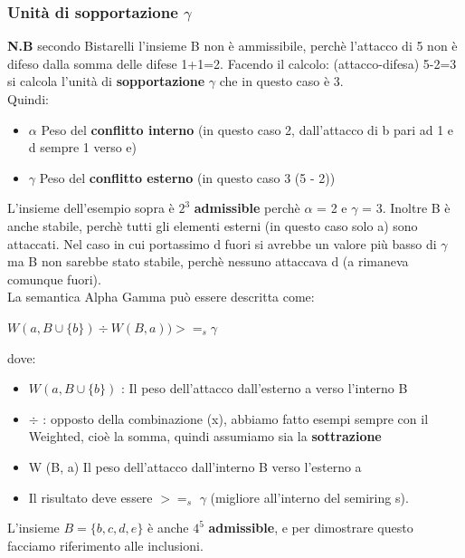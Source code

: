 \subsubsection{Unità di sopportazione $\gamma$}
\textbf{N.B} secondo Bistarelli l’insieme B non è ammissibile, perchè l’attacco di 5 non è difeso dalla somma delle difese 1+1=2. Facendo il calcolo: (attacco-difesa) 5-2=3 si calcola l’unità di \textbf{sopportazione} $\gamma$ che in questo caso è 3.
\\Quindi:
\begin{itemize}
    \item $\alpha$ Peso del \textbf{conflitto interno} (in questo caso 2, dall’attacco di b pari ad 1 e d sempre 1 verso e)
    \item $\gamma$ Peso del \textbf{conflitto esterno} (in questo caso 3 (5 - 2))
\end{itemize}
L’insieme dell’esempio sopra è $2^3$ \textbf{admissible} perchè $\alpha$ = 2 e $\gamma$ = 3. Inoltre B è anche stabile, perchè tutti gli elementi esterni (in questo caso solo a) sono attaccati. Nel caso in cui portassimo d fuori si avrebbe un valore più basso di $\gamma$ ma B non sarebbe stato stabile, perchè nessuno attaccava d (a rimaneva comunque fuori).
\\
La semantica Alpha Gamma può essere descritta come:
\begin{center}
    $W (a, B \cup \{b\}) \div W (B, a)) >=_s \gamma$
\end{center}
dove:
\begin{itemize}
    \item $W (a, B \cup \{b\})$ : Il peso dell’attacco dall’esterno a verso l’interno B
    \item $\div$ : opposto della combinazione (x), abbiamo fatto esempi sempre con il Weighted, cioè la somma, quindi assumiamo sia la \textbf{sottrazione}
    \item W (B, a) Il peso dell’attacco dall’interno B verso l’esterno a
    \item Il risultato deve essere $>=_s$ $\gamma$ (migliore all’interno del semiring s).
\end{itemize}
L’insieme $B = \{b, c, d, e\}$ è anche $4^5$ \textbf{admissible}, e per dimostrare questo facciamo riferimento alle inclusioni.

